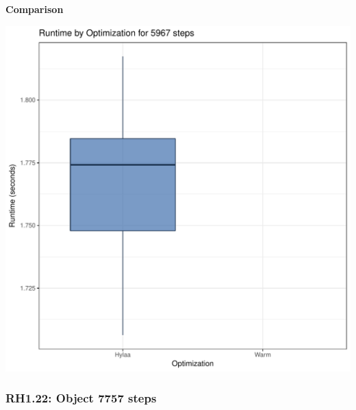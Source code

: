 \documentclass{article}\usepackage[]{graphicx}\usepackage[]{color}
\makeatletter
\def\maxwidth{ %
  \ifdim\Gin@nat@width>\linewidth
    \linewidth
  \else
    \Gin@nat@width
  \fi
}
\newenvironment{knitrout}{}{} %
\makeatother
\begin{document}
 \textbf{Comparison}
  
\begin{knitrout}
\color{fgcolor}
\includegraphics[width=\maxwidth]{figure/RH1_steps5967-1} 

\end{knitrout}


\subsubsection{RH1.22: Object 7757 steps}
\end{document}
